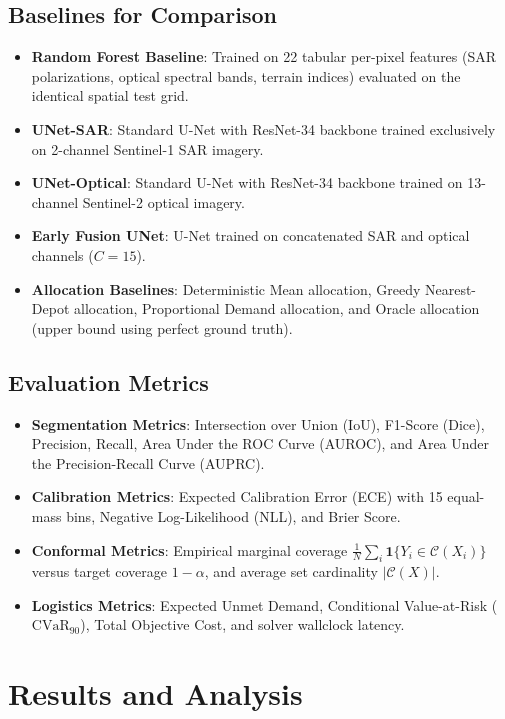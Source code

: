 \documentclass[journal]{IEEEtran}
\begin{document}
\subsection{Baselines for Comparison}
\begin{itemize}
    \item \textbf{Random Forest Baseline}: Trained on 22 tabular per-pixel features (SAR polarizations, optical spectral bands, terrain indices) evaluated on the identical spatial test grid.
    \item \textbf{UNet-SAR}: Standard U-Net with ResNet-34 backbone trained exclusively on 2-channel Sentinel-1 SAR imagery.
    \item \textbf{UNet-Optical}: Standard U-Net with ResNet-34 backbone trained on 13-channel Sentinel-2 optical imagery.
    \item \textbf{Early Fusion UNet}: U-Net trained on concatenated SAR and optical channels ($C = 15$).
    \item \textbf{Allocation Baselines}: Deterministic Mean allocation, Greedy Nearest-Depot allocation, Proportional Demand allocation, and Oracle allocation (upper bound using perfect ground truth).
\end{itemize}

\subsection{Evaluation Metrics}
\begin{itemize}
    \item \textbf{Segmentation Metrics}: Intersection over Union (IoU), F1-Score (Dice), Precision, Recall, Area Under the ROC Curve (AUROC), and Area Under the Precision-Recall Curve (AUPRC).
    \item \textbf{Calibration Metrics}: Expected Calibration Error (ECE) with 15 equal-mass bins, Negative Log-Likelihood (NLL), and Brier Score.
    \item \textbf{Conformal Metrics}: Empirical marginal coverage $\frac{1}{N} \sum_{i} \mathbf{1}\{Y_i \in \mathcal{C}(X_i)\}$ versus target coverage $1-\alpha$, and average set cardinality $|\mathcal{C}(X)|$.
    \item \textbf{Logistics Metrics}: Expected Unmet Demand, Conditional Value-at-Risk ($\text{CVaR}_{90}$), Total Objective Cost, and solver wallclock latency.
\end{itemize}

\section{Results and Analysis}
\label{sec:results}
\end{document}
